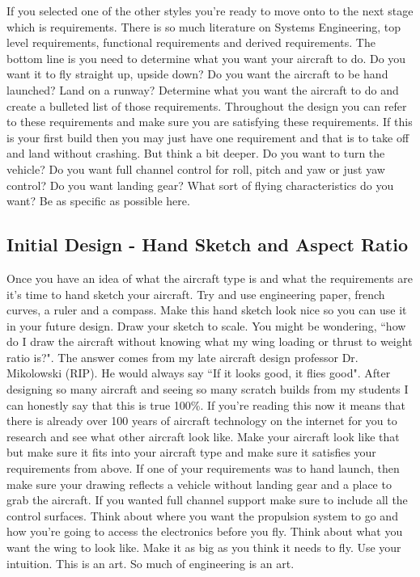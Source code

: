 \documentclass{article}
\begin{document}
If you selected one of the other styles you're ready to move onto to
the next stage which is requirements. There is so much literature on
Systems Engineering, top level requirements, functional
requirements and derived requirements. The bottom line is you need to
determine what you want your aircraft to do. Do you want it to fly
straight up, upside down? Do you want the aircraft to be hand
launched? Land on a runway? Determine what you want the aircraft to do
and create a bulleted list of those requirements. Throughout the
design you can refer to these requirements and make sure you are
satisfying these requirements. If this is your first build then you
may just have one requirement and that is to take off and land without
crashing. But think a bit deeper. Do you want to turn the vehicle? Do
you want full channel control for roll, pitch and yaw or just yaw
control? Do you want landing gear? What sort of flying characteristics
do you want? Be as specific as possible here. 

\subsection{Initial Design - Hand Sketch and Aspect Ratio}

Once you have an idea of what the aircraft type is and what the
requirements are it's time to hand sketch your aircraft. Try and use
engineering paper, french curves, a ruler and a compass. Make this
hand sketch look nice so you can use it in your future design. Draw
your sketch to scale. You might be wondering, ``how do I draw the
aircraft without knowing what my wing loading or thrust to weight
ratio is?". The answer comes from my late aircraft design professor
Dr. Mikolowski (RIP). He would always say ``If it looks good, it flies
good". After designing so many aircraft and seeing so many scratch
builds from my students I can honestly say that this is true
100\%. If you're reading this now it means that there is already over
100 years of aircraft technology on the internet for you to research
and see what other aircraft look like. Make your aircraft look like
that but make sure it fits into your aircraft type and make sure it
satisfies your requirements from above. If one of your requirements
was to hand launch, then make sure your drawing reflects a vehicle
without landing gear and a place to grab the aircraft. If you wanted
full channel support make sure to include all the control
surfaces. Think about where you want the propulsion system to go and
how you're going to access the electronics before you fly. Think about
what you want the wing to look like. Make it as big as you think it
needs to fly. Use your intuition. This is an art. So much of
engineering is an art.
\end{document}

